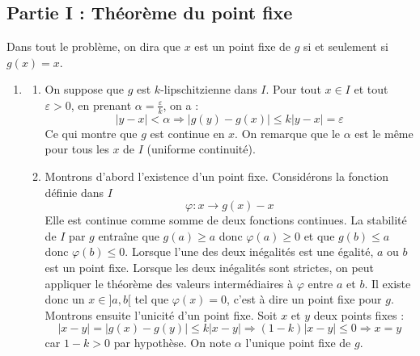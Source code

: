 \subsection*{Partie I : Théorème du point fixe}
Dans tout le problème, on dira que $x$ est un point fixe de $g$ si et seulement si $g(x)=x$.
\begin{enumerate}
 \item 
\begin{enumerate}
 \item 
On suppose que $g$ est $k$-lipschitzienne dans $I$.\newline
Pour tout $x\in I$ et tout $\varepsilon>0$, en prenant $\alpha = \frac{\varepsilon}{k}$, on a :
\begin{displaymath}
 |y-x|< \alpha \Rightarrow |g(y)-g(x)|\leq k |y-x|= \varepsilon
\end{displaymath}
Ce qui montre que $g$ est continue en $x$. On remarque que le $\alpha$ est le même pour tous les $x$ de $I$ (uniforme continuité).

\item Montrons d'abord l'existence d'un point fixe. \newline Considérons la fonction définie dans $I$
\begin{displaymath}
 \varphi : x \rightarrow g(x) - x
\end{displaymath}
Elle est continue comme somme de deux fonctions continues. La stabilité de $I$ par $g$ entraîne que $g(a)\geq a$ donc $\varphi(a) \geq 0$ et que $g(b)\leq a$ donc $\varphi(b) \leq 0$. Lorsque l'une des deux inégalités est une égalité, $a$ ou $b$ est un point fixe. Lorsque les deux inégalités sont strictes, on peut appliquer le théorème des valeurs intermédiaires à $\varphi$ entre $a$ et $b$. Il existe donc un $x\in ]a,b[$ tel que $\varphi(x)=0$, c'est à dire un point fixe pour $g$.\newline
Montrons ensuite l'unicité d'un point fixe. Soit $x$ et $y$ deux points fixes :
\begin{displaymath}
 |x-y|=|g(x)-g(y)|\leq k |x-y|\Rightarrow (1-k)|x-y|\leq 0 \Rightarrow x=y
\end{displaymath}
car $1-k >0$ par hypothèse.\newline
On note $\alpha$ l'unique point fixe de $g$.
\end{enumerate}


\end{enumerate}
